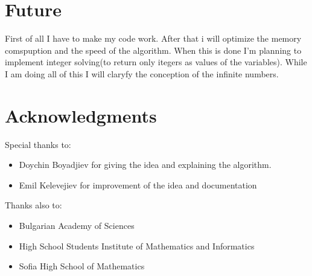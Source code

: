 \documentclass[]{article}
\begin{document}
	\section{Future}
	First of all I have to make my code work. After that i will optimize the memory comspuption and the speed of the algorithm. When this is done I'm planning to implement integer solving(to return only itegers as values of the variables). While I am doing  all of this I will claryfy the conception of the infinite numbers.
	\section{Acknowledgments}
 	 	 \Large{Special thanks to:
 	 	 \begin{itemize}
 	 	 	\item Doychin Boyadjiev for giving the idea and explaining the algorithm.
 	 	 	\item Emil Kelevejiev for improvement of the idea and documentation
 	 	 \end{itemize}
		 }
		 \large{Thanks also to:
 	 	 \begin{itemize}
 	 	 	\item Bulgarian Academy of Sciences
 	 	 	\item High School Students Institute of Mathematics and Informatics
 	 	 	\item Sofia High School of Mathematics
 	 	 \end{itemize}}
\end{document}
